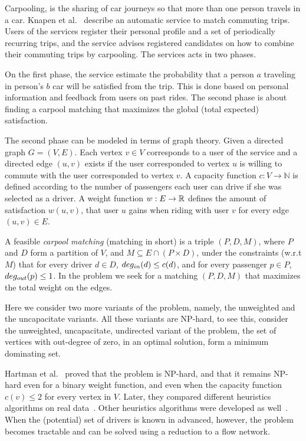 Carpooling, is the sharing of car journeys so that more than one person travels
in a car.
Knapen et al.~\cite{knapen2013estimating} describe an automatic service
to match commuting trips.
Users of the services register their personal profile and a set of periodically
recurring trips, 
and the service advises registered candidates on how to combine their commuting
trips by carpooling.
The services acts in two phases. 

On the first phase, the service estimate the probability that a person $a$
traveling in person's $b$ car will be satisfied from the trip.
This is done based on personal information and feedback from users on past
rides.
The second phase is about finding a carpool matching
that maximizes the global (total expected) satisfaction.

The second phase can be modeled in terms of graph theory.
Given a directed graph $G = (V, E)$.
Each vertex $v \in V$ corresponds to a user of the service and a directed
edge $(u, v)$ exists if the user corresponded to vertex $u$ is willing to
commute with the user corresponded to vertex $v$.
A capacity function $ c: V \rightarrow \mathbb{N} $ is defined
according to the number of passengers each user can drive if she was
selected as a driver.
A weight function $w : E \rightarrow \mathbb{R} $ defines the amount of
satisfaction $w(u, v)$,
that user $u$ gains when riding with user $v$ for every edge $(u, v) \in E$.

A feasible \emph{carpool matching} (matching in short) is a triple 
$(P, D, M)$, where $P$ and $D$ form a partition of $V$, and 
$M \subseteq E \cap (P \times D)$,
under the constraints (w.r.t $M$) that for every driver $d \in D$, 
$deg_{in}(d) \leq c(d)$, 
and for every passenger $p \in P$, $deg_{out}(p) \leq 1$.
In the \textsc{\CARPOOL{}} problem we seek for a matching $(P, D, M)$ that maximizes the
total weight on the edges.

Here we consider two more variants of the problem, namely, 
the unweighted and the uncapacitate variants.
All these variants are NP-hard, to see this, 
consider the unweighted, uncapacitate, undirected variant of the problem, 
the set of vertices with out-degree of zero, in an optimal solution, 
form a minimum dominating set.  
  
Hartman et al.~\cite{hartman2013optimal} proved that the \emph{\CARPOOL{}} problem is
NP-hard, and that it remains NP-hard even for a binary weight function, and even when
the capacity function $c(v) \leq 2$ for every vertex in $V$.
Later, they compared different heuristics algorithms on real data~\cite{hartman2014theory}.
Other heuristics algorithms were developed as well~\cite{knapen2014exploiting}.
When the (potential) set of drivers is known in advanced, however, the problem becomes
tractable and can be solved using a reduction to a flow network.

